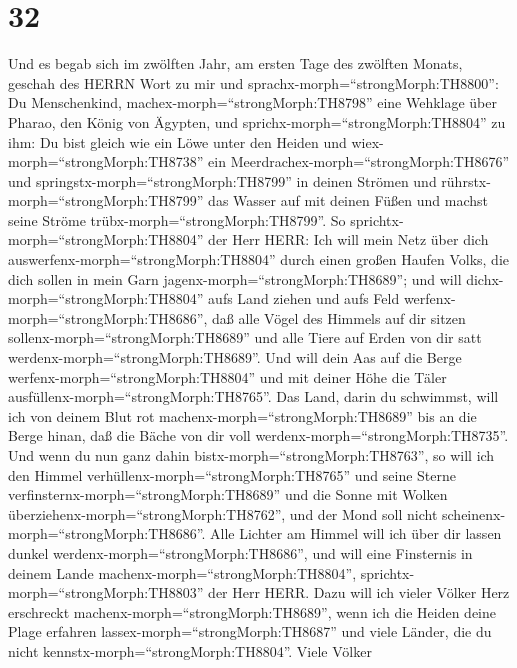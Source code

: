 \hypertarget{section-31}{%
\section{32}\label{section-31}}

 Und es begab sich im zwölften Jahr, am ersten Tage des
zwölften Monats, geschah des HERRN Wort zu mir und
sprachx-morph=``strongMorph:TH8800'':  Du Menschenkind,
machex-morph=``strongMorph:TH8798'' eine Wehklage über Pharao, den König
von Ägypten, und sprichx-morph=``strongMorph:TH8804'' zu ihm: Du bist
gleich wie ein Löwe unter den Heiden und
wiex-morph=``strongMorph:TH8738'' ein
Meerdrachex-morph=``strongMorph:TH8676'' und
springstx-morph=``strongMorph:TH8799'' in deinen Strömen und
rührstx-morph=``strongMorph:TH8799'' das Wasser auf mit deinen Füßen und
machst seine Ströme trübx-morph=``strongMorph:TH8799''.  So
sprichtx-morph=``strongMorph:TH8804'' der Herr HERR: Ich will mein Netz
über dich auswerfenx-morph=``strongMorph:TH8804'' durch einen großen
Haufen Volks, die dich sollen in mein Garn
jagenx-morph=``strongMorph:TH8689'';  und will
dichx-morph=``strongMorph:TH8804'' aufs Land ziehen und aufs Feld
werfenx-morph=``strongMorph:TH8686'', daß alle Vögel des Himmels auf dir
sitzen sollenx-morph=``strongMorph:TH8689'' und alle Tiere auf Erden von
dir satt werdenx-morph=``strongMorph:TH8689''.  Und will
dein Aas auf die Berge werfenx-morph=``strongMorph:TH8804'' und mit
deiner Höhe die Täler ausfüllenx-morph=``strongMorph:TH8765''.
 Das Land, darin du schwimmst, will ich von deinem Blut rot
machenx-morph=``strongMorph:TH8689'' bis an die Berge hinan, daß die
Bäche von dir voll werdenx-morph=``strongMorph:TH8735''. 
Und wenn du nun ganz dahin bistx-morph=``strongMorph:TH8763'', so will
ich den Himmel verhüllenx-morph=``strongMorph:TH8765'' und seine Sterne
verfinsternx-morph=``strongMorph:TH8689'' und die Sonne mit Wolken
überziehenx-morph=``strongMorph:TH8762'', und der Mond soll nicht
scheinenx-morph=``strongMorph:TH8686''.  Alle Lichter am
Himmel will ich über dir lassen dunkel
werdenx-morph=``strongMorph:TH8686'', und will eine Finsternis in deinem
Lande machenx-morph=``strongMorph:TH8804'',
sprichtx-morph=``strongMorph:TH8803'' der Herr HERR.  Dazu
will ich vieler Völker Herz erschreckt
machenx-morph=``strongMorph:TH8689'', wenn ich die Heiden deine Plage
erfahren lassex-morph=``strongMorph:TH8687'' und viele Länder, die du
nicht kennstx-morph=``strongMorph:TH8804''.  Viele Völker
